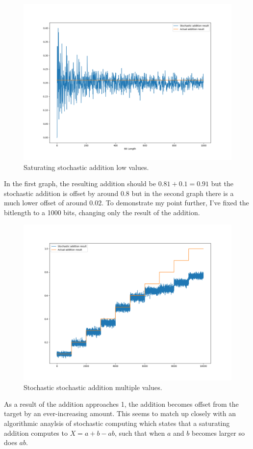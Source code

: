 \documentclass[a4paper,oneside,phd,etd]{BYUPhys}
\begin{document}
\begin{figure}[H]
\centering
\includegraphics[scale=0.4]{results/Figure_3_low.png}
\caption{Saturating stochastic addition low values.}
\label{fig:sat_low}
\end{figure}

In the first graph, the resulting addition should be $0.81+0.1=0.91$ but the stochastic addition is offset by around $0.8$ but in the second graph there is a much lower offset of around $0.02$. To demonstrate my point further, I've fixed the bitlength to a 1000 bits, changing only the result of the addition.

\begin{figure}[H]
\centering
\includegraphics[scale=0.4]{results/Figure_3_sss.png}
\caption{Stochastic stochastic addition multiple values.}
\label{fig:sat_add_multiple}
\end{figure}
As a result of the addition approaches 1, the addition becomes offset from the target by an ever-increasing amount. This seems to match up closely with an algorithmic anaylsis of stochastic computing which states that a saturating addition computes to $X = a+b-ab$\cite{logic-gates}, such that when $a$ and $b$ becomes larger so does $ab$.
\end{document}
